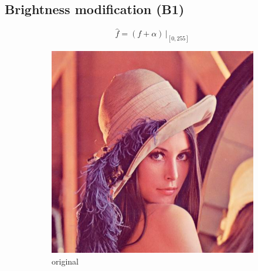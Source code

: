 \documentclass[12pt]{article}
\newcommand{\subfiguresize}{.3\textwidth}
\begin{document}
\subsection*{Brightness modification (B1)}

\begin{equation}
    \hat{f} = (f + \alpha) \, \Big|_{[0,255]}
\end{equation}

\begin{figure}[H]\centering
    \begin{subfigure}[t]{\subfiguresize}\centering
        \includegraphics[width=\textwidth]{lenac.png}
        \caption{original}
    \end{subfigure}
    \hspace{.05\textwidth}
    \begin{subfigure}[t]{\subfiguresize}\centering

\end{subfigure}
\end{figure}
\end{document}
